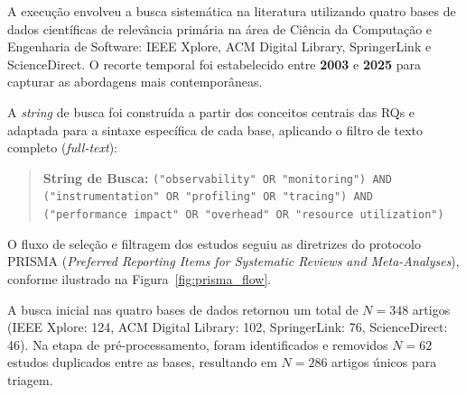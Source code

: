 \documentclass[sigconf, anonymous]{acmart}
\begin{document}
A execução envolveu a busca sistemática na literatura utilizando quatro bases de dados científicas de relevância primária na área de Ciência da Computação e Engenharia de Software: IEEE Xplore, ACM Digital Library, SpringerLink e ScienceDirect. O recorte temporal foi estabelecido entre \textbf{2003} e \textbf{2025} para capturar as abordagens mais contemporâneas.

A \textit{string} de busca foi construída a partir dos conceitos centrais das RQs e adaptada para a sintaxe específica de cada base, aplicando o filtro de texto completo (\textit{full-text}):

\begin{quote}
\textbf{String de Busca:} \texttt{("observability" OR "monitoring") AND ("instrumentation" OR "profiling" OR "tracing") AND ("performance impact" OR "overhead" OR "resource utilization")}
\end{quote}

O fluxo de seleção e filtragem dos estudos seguiu as diretrizes do protocolo PRISMA (\textit{Preferred Reporting Items for Systematic Reviews and Meta-Analyses}), conforme ilustrado na Figura~\ref{fig:prisma_flow}. 

A busca inicial nas quatro bases de dados retornou um total de $N = 348$ artigos (IEEE Xplore: 124, ACM Digital Library: 102, SpringerLink: 76, ScienceDirect: 46). Na etapa de pré-processamento, foram identificados e removidos $N = 62$ estudos duplicados entre as bases, resultando em $N = 286$ artigos únicos para triagem.
\end{document}

